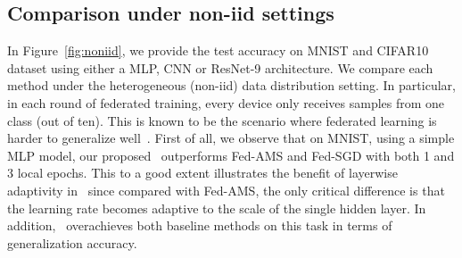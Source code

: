 \documentclass[twoside]{article}
\begin{document}
\subsection{Comparison under non-iid settings}

In Figure~\ref{fig:noniid}, we provide the test accuracy on  MNIST and CIFAR10 dataset using either a MLP, CNN or ResNet-9 architecture. 
We compare each method under the heterogeneous (non-iid) data distribution setting. In particular, in each round of federated training, every device only receives samples from one class (out of ten). 
This is known to be the scenario where federated learning is harder to generalize well~\citet{mcmahan2017communication}. 
First of all, we observe that on MNIST, using a simple MLP model, our proposed \algo\ outperforms Fed-AMS and Fed-SGD with both 1 and 3 local epochs. This to a good extent illustrates the benefit of layerwise adaptivity in \algo\, since compared with Fed-AMS, the only critical difference is that the learning rate becomes adaptive to the scale of the single hidden layer. 
In addition, \algo\ overachieves both baseline methods on this task in terms of generalization accuracy. 
\end{document}
